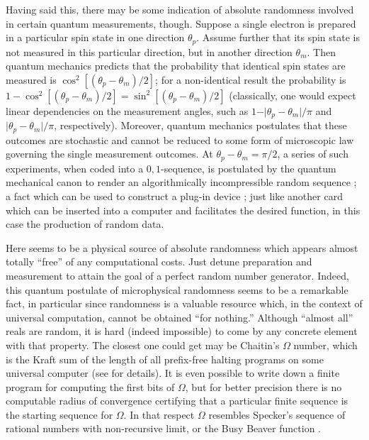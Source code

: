 \documentclass[pre,preprint,showpacs,showkeys,amsfonts]{revtex4}
\begin{document}
Having said this, there may be some indication of absolute randomness
involved in certain quantum measurements, though.
Suppose a single electron is prepared in a particular spin state in
one direction $\theta_p$.
Assume further that its spin state is not measured in this particular direction,
but in another direction $\theta_m$.
Then quantum mechanics predicts that the probability that identical
spin states are measured is $\cos^2[(\theta_p-\theta_m)/2]$; for a
non-identical result the probability is $1-\cos^2[(\theta_p-\theta_m)/2]=\sin^2[(\theta_p-\theta_m)/2]$
(classically, one would expect linear dependencies on the measurement angles,
such as $1- \vert \theta_p-\theta_m\vert /\pi$
and  $\vert \theta_p-\theta_m\vert /\pi $, respectively).
Moreover, quantum mechanics postulates
that these outcomes are  stochastic  and cannot be reduced
to some form of microscopic law governing the single measurement outcomes.
At $\theta_p-\theta_m = \pi /2$, a series of such experiments,
when coded into a $0,1$-sequence, is postulated by the quantum mechanical canon
to render an algorithmically incompressible random sequence
\cite{svozil-qct}; a fact
which can be used to construct a plug-in device \cite{zeilinger:qct};
just like another card which can be inserted into a computer and
facilitates the desired function, in this case the production of
random data.

Here seems to be a physical source of absolute randomness
\cite{chaitin3,chaitin:01,calude:02} which appears almost totally ``free''
of any computational costs.
Just detune preparation and measurement
to attain the goal of a perfect random number generator.
Indeed, this quantum postulate of microphysical randomness
seems to be a remarkable fact,
in particular since randomness is a valuable resource
which, in the context of universal computation, cannot be obtained ``for nothing.''
Although ``almost all'' reals are random, it is hard (indeed impossible)
to come by any concrete element with that property.
The closest one could get may be Chaitin's $\Omega$ number,
which is the Kraft sum of the length of all prefix-free halting programs
on some universal computer (see \cite{chaitin3,chaitin:01,calude:02} for details).
It is even possible to write down a finite
program for computing the first bits of $\Omega$,
but for better precision
there is no computable radius of convergence certifying that
a particular finite sequence is the starting sequence for $\Omega$.
In that respect $\Omega$ resembles Specker's sequence of rational numbers
 with non-recursive limit,
or the Busy Beaver function \cite{rado,brady,chaitin-bb}.
\end{document}
